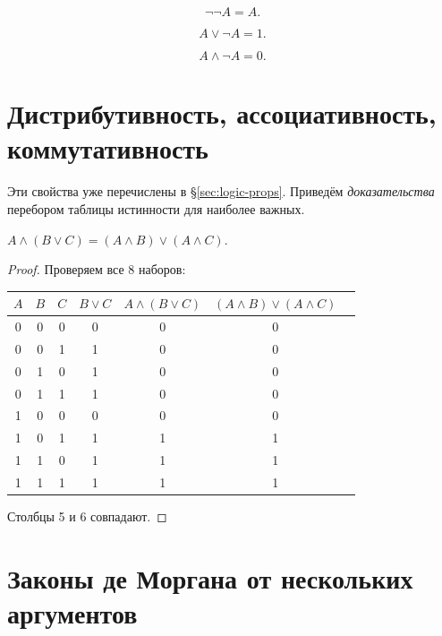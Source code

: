 \documentclass[12pt]{article}
\begin{document}
\begin{property}
\[
\neg \neg A = A.
\]
\end{property}

\begin{property}
\[
A \vee \neg A = 1.
\]
\end{property}

\begin{property}
\[
A \wedge \neg A = 0.
\]
\end{property}

\section{Дистрибутивность, ассоциативность, коммутативность}

Эти свойства уже перечислены в \S\ref{sec:logic-props}. Приведём \emph{доказательства}
перебором таблицы истинности для наиболее важных.

\begin{theorem}
$A \wedge (B \vee C) = (A \wedge B) \vee (A \wedge C)$.
\end{theorem}
\begin{proof}
Проверяем все 8 наборов:
\begin{center}
\begin{tabular}{|c|c|c|c|c|c|c|}
\hline
$A$ & $B$ & $C$ & $B \vee C$ & $A \wedge(B\vee C)$ &
$(A\wedge B)\vee(A\wedge C)$ \\
\hline
0&0&0& 0 & 0 & 0 \\
0&0&1& 1 & 0 & 0 \\
0&1&0& 1 & 0 & 0 \\
0&1&1& 1 & 0 & 0 \\
1&0&0& 0 & 0 & 0 \\
1&0&1& 1 & 1 & 1 \\
1&1&0& 1 & 1 & 1 \\
1&1&1& 1 & 1 & 1 \\
\hline
\end{tabular}
\end{center}
Столбцы 5 и 6 совпадают.
\end{proof}

\section{Законы де Моргана от нескольких аргументов}
\end{document}
